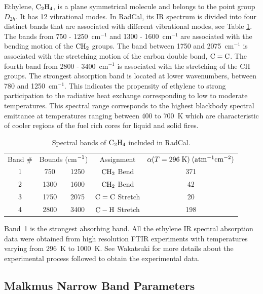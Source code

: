 Ethylene, $\rm C_2H_4$, is a plane symmetrical molecule and belongs to the point group $D_{2h}$. It has 12 vibrational modes. In RadCal, its IR spectrum is divided into four distinct bands that are associated with different vibrational modes, see Table \ref{Table::C2H4}. The bands from 750 - 1250~cm$^{-1}$ and 1300 - 1600~cm$^{-1}$ are associated with the bending motion of the $\rm CH_2$ groups. The band between 1750 and 2075~cm$^{-1}$ is associated with the stretching motion of the carbon double bond, $\rm C=C$. The fourth band from 2800 - 3400~cm$^{-1}$ is associated with the stretching of the CH groups. The strongest absorption band is located at lower wavenumbers, between 780 and 1250~cm$^{-1}$. This indicates the propensity of ethylene to strong participation to the radiative heat exchange corresponding to low to moderate temperatures. This spectral range corresponds to the highest blackbody spectral emittance at temperatures ranging between 400 to 700~K which are characteristic of cooler regions of the fuel rich cores for liquid and solid fires.
\begin{table}[ht]
    \centering
    \caption{Spectral bands of $\rm C_2H_4$ included in RadCal.}
    \vspace{0.1in}
    \label{Table::C2H4}
    \begin{tabular}{|c|c|c|c|c|}
      \hline
      Band \# & \multicolumn{2}{|l|}{Bounds (cm$\rm ^{-1}$) } & Assignment & $\alpha(T=296 \; {\rm K}) \; (\rm {atm^{-1} cm^{-2}})$\\
      \cline{1-5}
      1 & 750  & 1250 &  $\rm CH_2$ Bend      & 371 \\
      2 & 1300 & 1600 &  $\rm CH_2$ Bend      & 42  \\
      3 & 1750 & 2075 &  $\rm C=C$  Stretch   & 20  \\
      4 & 2800 & 3400 &  $\rm C-H$  Stretch   & 198 \\
      \hline
    \end{tabular}
\end{table}
Band~1 is the strongest absorbing band. All the ethylene IR spectral absorption data were obtained from high resolution FTIR experiments with temperatures varying from 296~K to 1000~K. See Wakatsuki \cite{Wakatsuki2005b} for more details about the experimental process followed to obtain the experimental data.

\subsection{Malkmus Narrow Band Parameters}

